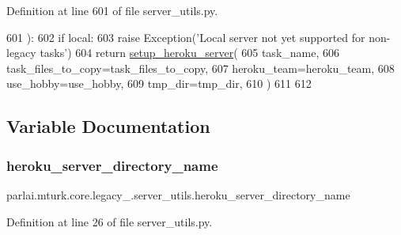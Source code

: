 Definition at line 601 of file server\+\_\+utils.\+py.


\begin{DoxyCode}
601 ):
602     \textcolor{keywordflow}{if} local:
603         \textcolor{keywordflow}{raise} Exception(\textcolor{stringliteral}{'Local server not yet supported for non-legacy tasks'})
604     \textcolor{keywordflow}{return} \hyperlink{namespaceparlai_1_1mturk_1_1core_1_1server__utils_af1c97e9b93a403e200ac75b87a51c3c1}{setup\_heroku\_server}(
605         task\_name,
606         task\_files\_to\_copy=task\_files\_to\_copy,
607         heroku\_team=heroku\_team,
608         use\_hobby=use\_hobby,
609         tmp\_dir=tmp\_dir,
610     )
611 
612 
\end{DoxyCode}


\subsection{Variable Documentation}
\mbox{\label{namespaceparlai_1_1mturk_1_1core_1_1legacy__2018_1_1server__utils_a7d771587f098e0e4e545182707f4eb60}} 
\subsubsection{\texorpdfstring{heroku\+\_\+server\+\_\+directory\+\_\+name}{heroku\_server\_directory\_name}}
{\footnotesize\ttfamily parlai.\+mturk.\+core.\+legacy\+\_.\+server\+\_\+utils.\+heroku\+\_\+server\+\_\+directory\+\_\+name}



Definition at line 26 of file server\+\_\+utils.\+py.

\mbox{\label{namespaceparlai_1_1mturk_1_1core_1_1legacy__2018_1_1server__utils_adf3edaded0fe67016e84220d39c99778}} 
